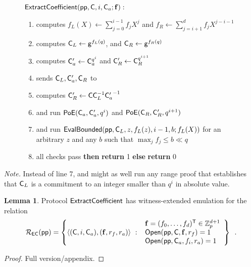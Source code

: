\documentclass{article}
\theoremstyle{definition}
\newtheorem{lemma}{Lemma}
\begin{document}
\begin{figure}[!htp]
\noindent\begin{mdframed}[userdefinedwidth=\textwidth]
\begin{minipage}{\textwidth}
	\begin{flushleft}
	$\textsf{{ExtractCoefficient}}(\textsf{pp}, \mathsf{C}, i, \mathsf{C}_a; \mathbf{f}):$ 
		\begin{enumerate}[nolistsep]
		    \item \prover computes $f_L(X) \gets \sum_{j=0}^{i-1} f_j X^j$ and $f_R \gets \sum_{j=i+1}^d f_j X^{j-i-1}$
		    \item \prover computes $\mathsf{C}_L \gets \mathsf{g}^{f_L(q)}$, and $\mathsf{C}_R \gets \mathsf{g}^{f_R(q)}$
		    \item \prover computes $\mathsf{C}_a' \gets \mathsf{C}_a^{q^i}$ and $\mathsf{C}_R' \gets \mathsf{C}_R^{q^{i+1}}$
		    \item \prover sends $\mathsf{C}_L, \mathsf{C}_a', \mathsf{C}_R$ to \verifier
		    \item \verifier computes $\mathsf{C}_R' \gets \mathsf{C} \mathsf{C}_L^{-1} {\mathsf{C}_a'}^{-1}$
		    \item \prover and \verifier run $\textsf{{PoE}}(\mathsf{C}_a, \mathsf{C}_a', q^i)$ and $\textsf{{PoE}}(\mathsf{C}_R, \mathsf{C}_R', q^{i+1})$
		    \item \prover and \verifier run $\textsf{{EvalBounded}}(\textsf{pp}, \mathsf{C}_L, z, f_L(z), i-1, b; f_L(X))$ for an arbitrary $z$ and any $b$ such that $\max_j f_j \leq b \ll q$
		    \item \pcif{}all checks pass \textbf{then} \textbf{return} 1 \textbf{else} \textbf{return} 0
		\end{enumerate}
	\end{flushleft}
\end{minipage}
\end{mdframed}
\end{figure}

\textit{Note.} Instead of line 7, \prover and \verifier might as well run any range proof that establishes that $\mathsf{C}_L$ is a commitment to an integer smaller than $q^i$ in absolute value.

\begin{lemma}
    Protocol $\textsf{{ExtractCoefficient}}$ has witness-extended emulation for the relation
    \[
        \mathcal{R}_\mathsf{EC}(\textsf{pp}) = \left\{
            \langle(\mathsf{C}, i, \mathsf{C}_a), (\mathbf{f}, r_f, r_a)\rangle \ : \ \begin{array}{l}
                 \mathbf{f} = (f_0, \ldots, f_d)^\mathsf{T} \in \mathbb{Z}_p^{d+1} \\
                 \textsf{{Open}}(\textsf{pp}, \mathsf{C}, \mathbf{f}, r_f) = 1 \\
                 \textsf{{Open}}(\textsf{pp}, \mathsf{C}_a, f_i, r_a) = 1
            \end{array}
        \right \} \enspace .
    \]
\end{lemma}
\begin{proof}
Full version/appendix.
\end{proof}
\end{document}
